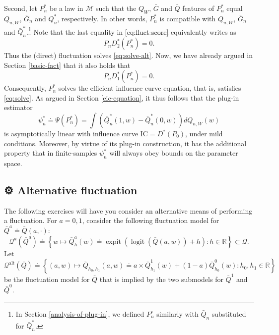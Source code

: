 \documentclass[
  11pt,
  openright,twoside]{book}
\DeclareMathOperator{\expit}{expit}
\DeclareMathOperator{\logit}{logit}
\newcommand{\gear}{\usebox{\gearbox}\;}
\newcommand{\bbR}{\mathbb{R}}
\newcommand{\defq}{\doteq}
\newcommand{\calM}{\mathcal{M}}
\newcommand{\calQ}{\mathcal{Q}}
\newcommand{\IC}{\textrm{IC}}
\newcommand{\Gbar}{\bar{G}}
\newcommand{\Phat}{P^{\circ}}
\newcommand{\Qbar}{\bar{Q}}
\theoremstyle{definition}
\theoremstyle{definition}
\theoremstyle{definition}
\theoremstyle{definition}
\theoremstyle{remark}
\begin{document}
Second, let \(P_{n}^{*}\) be a law in \(\calM\) such that the \(Q_{W}\), \(\Gbar\) and
\(\Qbar\) features of \(P_{n}^{*}\) equal \(Q_{n,W}\), \(\Gbar_{n}\) and \(Q_{n}^{*}\),
respectively. In other words, \(P_{n}^{*}\) is compatible with \(Q_{n,W}\),
\(\Gbar_{n}\) and \(\Qbar_{n}^{*}\).\footnote{In Section \ref{analysis-of-plug-in}, we
  defined \(\Phat_{n}\) similarly with \(\Qbar_{n}\) substituted for
  \(\Qbar_{n}^{*}\).} Note that the last equality in \eqref{eq:fluct-score}
equivalently writes as \begin{equation*}P_{n}  D_{2}^{*}   (P_{n}^{*})  =
0.\end{equation*} Thus the (direct) fluctuation solves
\eqref{eq:solve-alt}. Now, we have already argued in Section \ref{basic-fact}
that it also holds that \begin{equation*}P_{n}  D_{1}^{*}  (P_{n}^{*})  =
0.\end{equation*} Consequently, \(P_{n}^{*}\) solves the efficient influence
curve equation, that is, satisfies \eqref{eq:solve}. As argued in Section
\ref{eic-equation}, it thus follows that the plug-in estimator
\begin{equation*}     \psi_n^*    \defq     \Psi(P_{n}^{*})    =     \int
\left(\Qbar_n^*(1,w)  - \Qbar_n^*(0,w)\right)  dQ_{n,W}(w) \end{equation*} is
asymptotically linear with influence curve \(\IC = D^{*}(P_{0})\), under mild
conditions. Moreover, by virtue of its plug-in construction, it has the
additional property that in finite-samples \(\psi_n^*\) will always obey bounds
on the parameter space.

\hypertarget{exo-tmle-flucs}{%
\subsection{\texorpdfstring{⚙ \gear Alternative fluctuation}{⚙ Alternative fluctuation}}\label{exo-tmle-flucs}}

The following exercises will have you consider an alternative means of
performing a fluctuation. For \(a = 0, 1\), consider the following
fluctuation model for \(\Qbar^a \defq \Qbar(a,\cdot)\):
\begin{equation} 
\calQ^a(\Qbar^a)
\defq      \left\{w       \mapsto      \Qbar_{h}^a(w)      \defq
\expit\left(\logit\left(\Qbar(a,w)\right) +  h
\right) : h \in \bbR\right\} \subset \calQ. \label{eq:Q-fluct-alt} 
\end{equation}
Let
\begin{equation*}
  \calQ^{\text{alt}}(\Qbar)   \defq   \left\{(a,w)  \mapsto   \Qbar_{h_0,
  h_1}(a,w) \defq a \times
  \Qbar_{h_{1}}^1(w) + (1-a) \Qbar_{h_{0}}^0(w) : h_{0}, h_{1} \in \bbR\right\}
\end{equation*}
be the fluctuation model for \(\Qbar\) that is implied by the two submodels for
\(\Qbar^1\) and \(\Qbar^0\).
\end{document}
